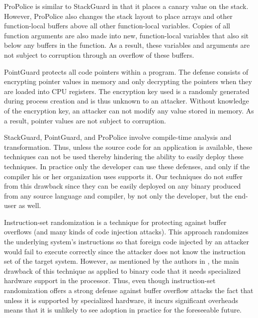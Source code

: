 ProPolice \cite{eto2002propolice} is similar to StackGuard in that it
places a canary value on the stack. However, ProPolice also changes
the stack layout to place arrays and other function-local buffers
above all other function-local variables. Copies of all function
arguments are also made into new, function-local variables that also
sit below any buffers in the function. As a result, these variables
and arguments are not subject to corruption through an overflow of
these buffers.

PointGuard \cite{pointguard} protects all code pointers within a
program. The defense consists of encrypting pointer values in memory
and only decrypting the pointers when they are loaded into CPU
registers. The encryption key used is a randomly generated during
process creation and is thus unknown to an attacker. Without knowledge
of the encryption key, an attacker can not modify any value stored in
memory. As a result, pointer values are not subject to corruption.

StackGuard, PointGuard, and ProPolice involve compile-time analysis
and transformation. Thus, unless the source code for an application is
available, these techniques can not be used thereby hindering the
ability to easily deploy these techniques. In practice only the
developer can use these defenses, and only if the compiler his or her
organization uses supports it. Our techniques do not suffer from this
drawback since they can be easily deployed on any binary produced from
any source language and compiler, by not only the developer, but the
end-user as well.


 Instruction-set randomization
\cite{isr} is a technique for protecting against buffer
overflows (and many kinds of code injection attacks). This approach
randomizes the underlying system's instructions so that foreign code
injected by an attacker would fail to execute correctly since the
attacker does not know the instruction set of the target
system. However, as mentioned by the authors in \cite{isr}, the main
drawback of this technique as applied to binary code that it needs
specialized hardware support in the processor. Thus, even though
instruction-set randomization offers a strong defense against buffer
overflow attacks the fact that unless it is supported by specialized
hardware, it incurs significant overheads means that it is unlikely to
see adoption in practice for the foreseeable future.

